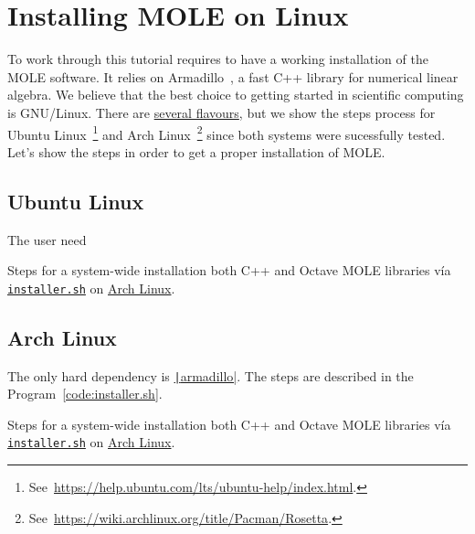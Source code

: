 \appendix

\chapter{Installing MOLE on Linux}

To work through this tutorial requires to have a working installation
of the MOLE software.
It relies on Armadillo~\cite{Sanderson2025}, a fast C++ library for
numerical linear algebra. %
We believe that the best choice to getting started in scientific
computing is GNU/Linux.
There are \href{https://upload.wikimedia.org/wikipedia/commons/1/1b/Linux_Distribution_Timeline.svg}{several flavours},
but we show the steps process for Ubuntu
Linux~\footnote{See~\url{https://help.ubuntu.com/lts/ubuntu-help/index.html}.}
and Arch Linux~\footnote{See~\url{https://wiki.archlinux.org/title/Pacman/Rosetta}.}
since both systems were sucessfully tested.
Let's show the steps in order to get a proper installation of MOLE.

\section{Ubuntu Linux}

The user need

\begin{listing}[ht!]
	\tiny
	\centering
	\caption{Steps for a system-wide installation both C++ and Octave
		MOLE libraries vía \href{https://raw.githubusercontent.com/carlosal1015/mole_examples/main/homework/installer.sh}{\texttt{installer.sh}} on
		\href{https://archlinux.org}{Arch Linux}.}
	\label{code:installer.sh}
\end{listing}

\section{Arch Linux}

The only hard dependency is
\href{https://arma.sourceforge.net/docs.html}{\texttt|armadillo|}.
The steps are described in the Program~\ref{code:installer.sh}.

\begin{listing}[ht!]
	\tiny
	\centering
	\caption{Steps for a system-wide installation both C++ and Octave
		MOLE libraries vía \href{https://raw.githubusercontent.com/carlosal1015/mole_examples/main/homework/installer.sh}{\texttt{installer.sh}} on
		\href{https://archlinux.org}{Arch Linux}.}
	\label{code:installer.sh}
\end{listing}

